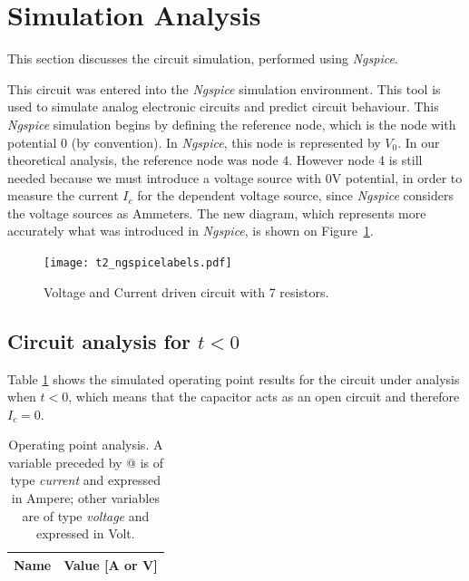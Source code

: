 \pagebreak
\section{Simulation Analysis}
\label{sec:simulation}

\indent

This section discusses the circuit simulation, performed using {\it Ngspice}. 

This circuit was entered into the {\it Ngspice} simulation environment. This tool is used to simulate analog electronic circuits and predict circuit behaviour. 
This {\it Ngspice} simulation begins by defining the reference node, which is the node with potential 0 (by convention). In {\it Ngspice}, this node is represented by $V_0$. In our theoretical analysis, the reference node was node 4. However node 4 is still needed because we must introduce a voltage source with 0V potential, in order to measure the current $I_c$ for the dependent voltage source, since {\it Ngspice} considers the voltage sources as Ammeters.
The new diagram, which represents more accurately what was introduced in {\it Ngspice}, is shown on Figure~\ref{fig:ngspiceCircuit}.

\begin{figure}[H] \centering
    \texttt{[image: t2\_ngspicelabels.pdf]}
    \caption{Voltage and Current driven circuit with 7 resistors.}
    \label{fig:ngspiceCircuit}
\end{figure}



\subsection{Circuit analysis for $t<0$}

\indent

Table \ref{tab:OpNg} shows the simulated operating point results for the circuit
under analysis when $t<0$, which means that the capacitor acts as an open circuit and therefore $I_c=0$.
\begin{table}[H]
  \centering
  \begin{tabular}{|l|r|}
    \hline    
    {\bf Name} & {\bf Value [A or V]} \\ \hline
    
  \end{tabular}
  \caption{Operating point analysis. A variable preceded by @ is of type {\em current}
    and expressed in Ampere; other variables are of type {\it voltage} and expressed in
    Volt.}
  \label{tab:OpNg}
\end{table}


